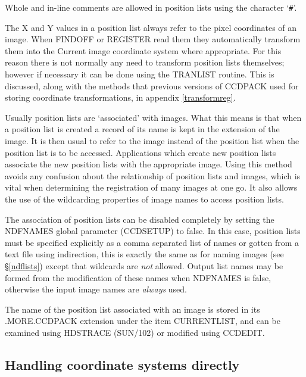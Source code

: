 \documentclass[twoside,11pt]{article}
\newcommand{\hyperref}[4]{#2\ref{#4}#3}
\newcommand{\htmlref}[2]{#1}
\newcommand{\xref}[3]{#1}
\newcommand{\xlabel}[1]{}
\renewcommand{\_}{\texttt{\symbol{95}}}
\newcommand{\routine}[1]{{\sc #1}}
\newcommand{\xroutine}[1]{\htmlref{{\sc #1}}{#1}}
\begin{document}
Whole and in-line comments are allowed in position lists using the
character `{\tt \#}'.

The X and Y values in a position list always refer to the 
pixel coordinates of an image.
When \routine{FINDOFF} or \routine{REGISTER} read them they
automatically transform them into the Current image coordinate system
where appropriate.
For this reason there is not normally any need to transform position
lists themselves; however if necessary it can be done using the
\xroutine{TRANLIST} routine.  This is discussed, along with the
methods that previous versions of CCDPACK used 
for storing coordinate transformations,
in appendix \ref{transformreg}.

Usually position lists are `associated' with images. What this means is
that when a position list is created a record of its name is kept in the
extension of the image. It is then usual to refer to the image instead of
the position list when the position list is to be accessed. Applications
which create new position lists associate the new position lists with
the appropriate image. Using this method avoids any confusion about the
relationship of position lists and images, which is vital when determining
the registration of many images at one go. It also allows the use of the
wildcarding properties of image names to access position lists.

The association of position lists can be disabled completely by setting
the NDFNAMES global parameter
(\xroutine{CCDSETUP}) to false. In this case, position lists must be specified
explicitly as a comma separated list of names or gotten from a text
file using indirection, this is exactly the same as for naming images
(see \hyperref{``processing lists of data''}{\S}{}{ndflists}) except that
wildcards are {\em not} allowed. Output list names may be formed
from the modification of these names when NDFNAMES is false, otherwise
the input image names are {\em always} used.

The name of the position list associated with an image is stored
in its .MORE.CCDPACK extension under the item CURRENT\_LIST, and
can be examined using \xref{HDSTRACE (SUN/102)}{sun102}{}
or modified using \xroutine{CCDEDIT}.




\subsection{\xlabel{wcsdirect}\label{wcsdirect}Handling coordinate systems
            directly}
\end{document}
